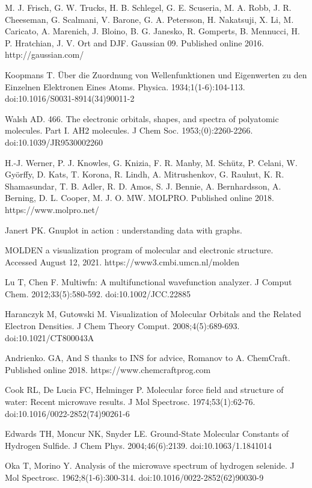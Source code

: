 \documentclass[12pt]{report}
\begin{document}
\begin{thebibliography}{13}
 M. J. Frisch, G. W. Trucks, H. B. Schlegel, G. E. Scuseria, M. A. Robb, J. R. Cheeseman, G. Scalmani, V. Barone, G. A. Petersson, H. Nakatsuji, X. Li, M. Caricato, A. Marenich, J. Bloino, B. G. Janesko, R. Gomperts, B. Mennucci, H. P. Hratchian, J. V. Ort  and DJF. Gaussian 09. Published online 2016. http://gaussian.com/


  Koopmans T. Über die Zuordnung von Wellenfunktionen und Eigenwerten zu den Einzelnen Elektronen Eines Atoms. Physica. 1934;1(1-6):104-113. doi:10.1016/S0031-8914(34)90011-2

 Walsh AD. 466. The electronic orbitals, shapes, and spectra of polyatomic molecules. Part I. AH2 molecules. J Chem Soc. 1953;(0):2260-2266. doi:10.1039/JR9530002260

H.-J. Werner, P. J. Knowles, G. Knizia, F. R. Manby, M. Schütz, P. Celani, W. Györffy, D. Kats, T. Korona, R. Lindh, A. Mitrushenkov, G. Rauhut, K. R. Shamasundar, T. B. Adler, R. D. Amos, S. J. Bennie, A. Bernhardsson, A. Berning, D. L. Cooper, M. J. O. MW. MOLPRO. Published online 2018. https://www.molpro.net/


 Janert PK.
Gnuplot in action :
understanding data with graphs.

MOLDEN a visualization program of molecular and electronic structure. Accessed August 12, 2021. https://www3.cmbi.umcn.nl/molden

Lu T, Chen F. Multiwfn: A multifunctional wavefunction analyzer. J Comput Chem. 2012;33(5):580-592. doi:10.1002/JCC.22885

Haranczyk M, Gutowski M. Visualization of Molecular Orbitals and the Related Electron Densities. J Chem Theory Comput. 2008;4(5):689-693. doi:10.1021/CT800043A

Andrienko. GA, And S thanks to INS for advice, Romanov  to A. ChemCraft. Published online 2018. https://www.chemcraftprog.com

Cook RL, De Lucia FC, Helminger P. Molecular force field and structure of water: Recent microwave results. J Mol Spectrosc. 1974;53(1):62-76. doi:10.1016/0022-2852(74)90261-6

 Edwards TH, Moncur NK, Snyder LE. Ground‐State Molecular Constants of Hydrogen Sulfide. J Chem Phys. 2004;46(6):2139. doi:10.1063/1.1841014

Oka T, Morino Y. Analysis of the microwave spectrum of hydrogen selenide. J Mol Spectrosc. 1962;8(1-6):300-314. doi:10.1016/0022-2852(62)90030-9


\end{thebibliography}
\end{document}
